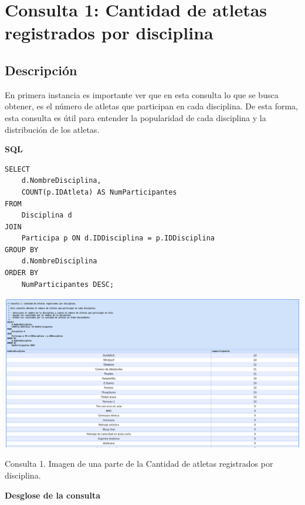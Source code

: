 \section*{Consulta 1: Cantidad de atletas registrados por disciplina}

\subsection*{Descripción}
En primera instancia es importante ver que en esta consulta lo que se busca obtener, es el número de atletas que participan en cada disciplina. De esta forma, esta consulta es útil para entender la popularidad de cada disciplina y la distribución de los atletas.

\textbf{SQL}

\begin{verbatim}
SELECT 
    d.NombreDisciplina,
    COUNT(p.IDAtleta) AS NumParticipantes
FROM 
    Disciplina d
JOIN 
    Participa p ON d.IDDisciplina = p.IDDisciplina
GROUP BY 
    d.NombreDisciplina
ORDER BY 
    NumParticipantes DESC;
\end{verbatim}

\begin{center}
    \includegraphics[width=16.5cm]{resources/Chapters/Consultas/Imagenes/Consulta1.jpeg} 
    
   Consulta 1. Imagen de una parte de la Cantidad de atletas registrados por disciplina.
\end{center}

\textbf{Desglose de la consulta}

